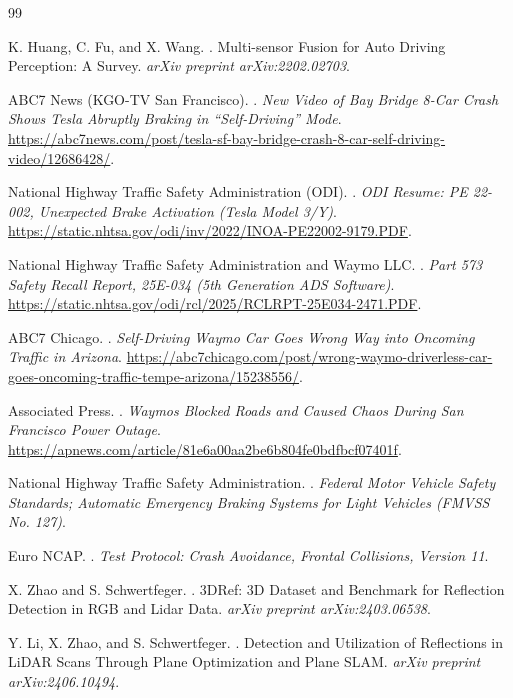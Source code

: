 \documentclass[sigconf,nonacm]{acmart}
\begin{document}
\begin{thebibliography}{99}

K. Huang, C. Fu, and X. Wang.
.
\newblock Multi-sensor Fusion for Auto Driving Perception: A Survey.
\newblock \textit{arXiv preprint arXiv:2202.02703}.

ABC7 News (KGO-TV San Francisco).
.
\newblock \textit{New Video of Bay Bridge 8-Car Crash Shows Tesla Abruptly Braking in ``Self-Driving'' Mode}.
\newblock \url{https://abc7news.com/post/tesla-sf-bay-bridge-crash-8-car-self-driving-video/12686428/}.

National Highway Traffic Safety Administration (ODI).
.
\newblock \textit{ODI Resume: PE 22-002, Unexpected Brake Activation (Tesla Model 3/Y)}.
\newblock \url{https://static.nhtsa.gov/odi/inv/2022/INOA-PE22002-9179.PDF}.

National Highway Traffic Safety Administration and Waymo LLC.
.
\newblock \textit{Part 573 Safety Recall Report, 25E-034 (5th Generation ADS Software)}.
\newblock \url{https://static.nhtsa.gov/odi/rcl/2025/RCLRPT-25E034-2471.PDF}.

ABC7 Chicago.
.
\newblock \textit{Self-Driving Waymo Car Goes Wrong Way into Oncoming Traffic in Arizona}.
\newblock \url{https://abc7chicago.com/post/wrong-waymo-driverless-car-goes-oncoming-traffic-tempe-arizona/15238556/}.

Associated Press.
.
\newblock \textit{Waymos Blocked Roads and Caused Chaos During San Francisco Power Outage}.
\newblock \url{https://apnews.com/article/81e6a00aa2be6b804fe0bdfbcf07401f}.

National Highway Traffic Safety Administration.
.
\newblock \textit{Federal Motor Vehicle Safety Standards; Automatic Emergency Braking Systems for Light Vehicles (FMVSS No. 127)}.

Euro NCAP.
.
\newblock \textit{Test Protocol: Crash Avoidance, Frontal Collisions, Version 11}.

X. Zhao and S. Schwertfeger.
.
\newblock 3DRef: 3D Dataset and Benchmark for Reflection Detection in RGB and Lidar Data.
\newblock \textit{arXiv preprint arXiv:2403.06538}.

Y. Li, X. Zhao, and S. Schwertfeger.
.
\newblock Detection and Utilization of Reflections in LiDAR Scans Through Plane Optimization and Plane SLAM.
\newblock \textit{arXiv preprint arXiv:2406.10494}.


\end{thebibliography}
\end{document}
